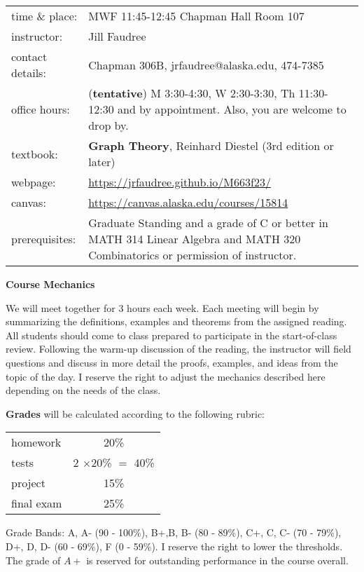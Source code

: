 \documentclass[12pt]{article}
\begin{document}
\begin{tabular}{p{} p{}}
{time \& place}:&MWF 11:45-12:45 Chapman Hall Room 107\\
{instructor:} &Jill Faudree\\
{contact details:} &Chapman 306B, jrfaudree@alaska.edu, 474-7385\\
{office hours:} &(\textbf{tentative})  M 3:30-4:30, W 2:30-3:30, Th 11:30-12:30 and by appointment. Also, you are welcome to drop by.\\
{textbook:}& \textbf{Graph Theory}, Reinhard Diestel (3rd edition or later)\\
{webpage:}& \url{https://jrfaudree.github.io/M663f23/}\\
canvas:&\url{https://canvas.alaska.edu/courses/15814}\\
{prerequisites:} &Graduate Standing and a grade of C or better in MATH 314 Linear Algebra and MATH 320 Combinatorics or permission of instructor.
\end{tabular}

\newpage

{\textbf{\large{Course Mechanics}}}

We will meet together for 3 hours each week. Each meeting will begin by summarizing the definitions, examples and theorems from the assigned reading. All students should come to class prepared to participate in the start-of-class review. Following the warm-up discussion of the reading, the instructor will field questions and discuss in more detail the proofs, examples, and ideas from the topic of the day.  I reserve the right to adjust the mechanics described here depending on the needs of the
class.

\textbf{Grades} will be calculated according to the following rubric:

\begin{tabular}{|l|c|}
  \hline
  homework & 20\% \\
  tests & 2 $\times$20\% $=$ 40\%\\
  project & 15\%\\
  final exam & 25\% \\
  \hline
\end{tabular}

Grade Bands: A, A- (90 - 100\%), B+,B, B- (80 - 89\%), C+, C, C- (70 - 79\%), D+, D, D-
(60 - 69\%), F (0 - 59\%).  I reserve the right to lower the thresholds. The grade of $A+$ is reserved for outstanding performance in the course overall.\\
\end{document}

